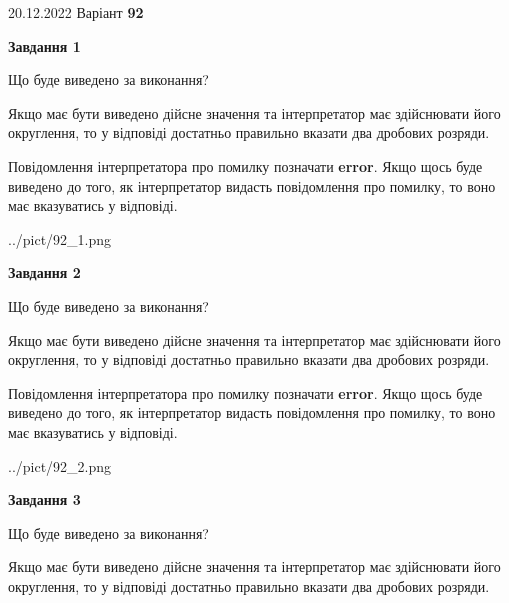 \documentclass[12pt, ukrainian]{article}
\begin{document}
{20.12.2022 Варіант \No \textbf { 92 }\par}
{
\begin {Large}

{\begin {center}\textbf{Завдання 1}\end {center}}\par
Що буде виведено за виконання? \par

Якщо має бути виведено дійсне значення та інтерпретатор має здійснювати його округлення, 
то у відповіді достатньо правильно вказати два дробових розряди.

Повідомлення інтерпретатора про помилку позначати \textbf{error}.
Якщо щось буде виведено до того, як інтерпретатор видасть повідомлення про помилку, 
то воно має вказуватись у відповіді. \par

\begin{center}
	{../pict/92_1.png}
\end{center}
\newpage

{\begin {center}\textbf{Завдання 2}\end {center}}\par
Що буде виведено за виконання? \par

Якщо має бути виведено дійсне значення та інтерпретатор має здійснювати його округлення, 
то у відповіді достатньо правильно вказати два дробових розряди.

Повідомлення інтерпретатора про помилку позначати \textbf{error}.
Якщо щось буде виведено до того, як інтерпретатор видасть повідомлення про помилку, 
то воно має вказуватись у відповіді. \par

\begin{center}
	{../pict/92_2.png}
\end{center}
\newpage

{\begin {center}\textbf{Завдання 3}\end {center}}\par
Що буде виведено за виконання? \par

Якщо має бути виведено дійсне значення та інтерпретатор має здійснювати його округлення, 
то у відповіді достатньо правильно вказати два дробових розряди.


\end{Large}}
\end{document}
